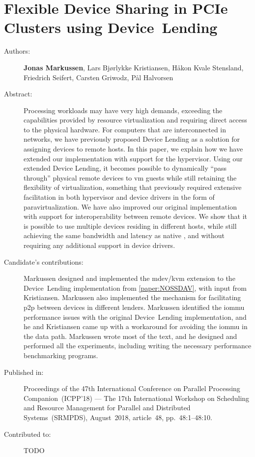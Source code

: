 \chapter{Flexible Device Sharing in PCIe Clusters using Device~Lending}
\label{paper:SRMPDS}
\paperthumb

\begin{description}
	\item[Authors:]
		\textbf{Jonas Markussen}, Lars Bj{\o}rlykke Kristiansen, H{\aa}kon Kvale Stensland,
		Friedrich Seifert, Carsten Griwodz, P{\aa}l Halvorsen

	\item[Abstract:]
		Processing workloads may have very high  demands, exceeding the capabilities provided by resource
		virtualization and requiring direct access to the physical hardware.
		For computers that are interconnected in  networks, we have previously proposed 
		Device Lending as a solution for assigning devices to remote hosts. In this paper, we
		explain how we have extended our implementation with support for the  \gls{hypervisor}.
		Using our extended Device Lending, it becomes possible to dynamically ``pass through'' physical remote devices
		to \acrshort{vm} guests while still retaining the flexibility of virtualization, something that previously required
		extensive facilitation in both \gls{hypervisor} and device drivers in the form of \gls{paravirtualization}.
		We have also improved our original implementation with support for interoperability between remote devices.
		We show that it is possible to use multiple devices residing in different hosts, while still achieving the same
		bandwidth and latency as native , and without requiring any additional support in device drivers. 


	\item[Candidate's contributions:]
		Markussen designed and implemented the \acrshort{mdev}/\acrshort{kvm} extension to the Device~Lending implementation from \cref{paper:NOSSDAV}, with input from Kristiansen.
		Markussen also implemented the mechanism for facilitating \acrshort{p2p} between devices
		in different lenders.
		Markussen identified the \acrshort{iommu} performance issues with the original Device~Lending implementation, and he and Kristiansen came up with a workaround for avoiding the \acrshort{iommu} in the data path. 
		Markussen wrote most of the text, and he designed and performed all the experiments, including writing the necessary performance benchmarking programs.

	\item[Published in:]
		Proceedings of the 47th International Conference on Parallel Processing Companion~(ICPP'18) ---
		The 17th International Workshop on Scheduling and Resource Management for Parallel and Distributed Systems~(SRMPDS),
		August~2018, article~48, pp.~48:1--48:10.

	\item[Contributed to:]
		TODO

\end{description}
